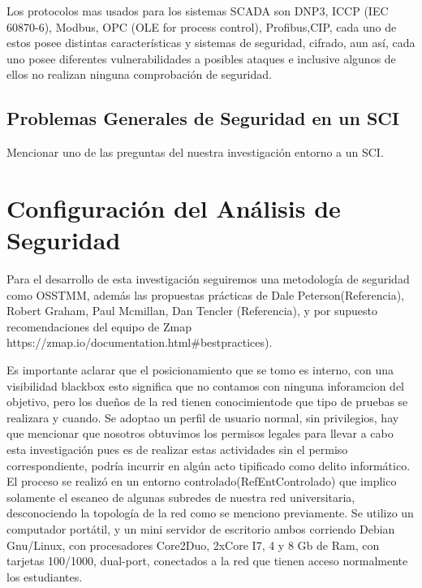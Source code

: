 \documentclass[jou,apacite]{apa6}   %
\begin{document}
Los protocolos mas usados para los sistemas SCADA son DNP3, ICCP (IEC 60870-6), Modbus, OPC (OLE for process control), Profibus,CIP, cada uno de estos posee distintas características y sistemas de seguridad, cifrado, aun así, cada uno posee diferentes vulnerabilidades a posibles ataques e inclusive algunos de ellos no realizan ninguna comprobación de seguridad.

\subsection{Problemas Generales de Seguridad en un SCI }
Mencionar uno de las preguntas del nuestra investigación entorno a un SCI.

\section{Configuración del Análisis de Seguridad}
Para el desarrollo de esta investigación seguiremos una metodología de seguridad como OSSTMM, además las propuestas prácticas de Dale Peterson(Referencia), Robert Graham, Paul Mcmillan, Dan Tencler (Referencia), y por supuesto recomendaciones del equipo de Zmap https://zmap.io/documentation.html\#bestpractices).

Es importante aclarar que el posicionamiento que se tomo es  interno, con una visibilidad blackbox esto significa que no contamos con ninguna inforamcion del objetivo, pero los dueños de la red tienen conocimientode que tipo de pruebas se realizara y cuando. Se adoptao un perfil de usuario normal, sin privilegios, hay que mencionar que nosotros obtuvimos los permisos legales para  llevar a cabo esta investigación pues es de realizar estas actividades sin el permiso correspondiente,  podría incurrir en algún acto tipificado como delito informático. El proceso se realizó en un entorno controlado(RefEntControlado) que implico solamente el escaneo de  algunas subredes de nuestra red universitaria, desconociendo la topología de la red como se menciono previamente. Se utilizo un computador portátil, y un mini servidor de escritorio ambos corriendo Debian Gnu/Linux, con procesadores Core2Duo, 2xCore I7,  4 y 8 Gb  de Ram, con tarjetas 100/1000, dual-port, conectados a la red que tienen acceso normalmente los estudiantes.
\end{document}
